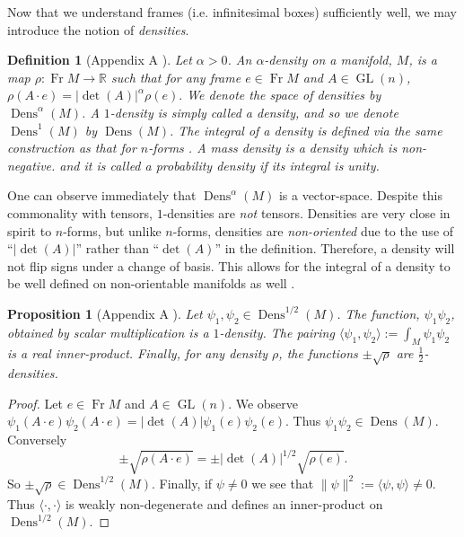\documentclass[letterpaper, 12 pt]{amsart}
\newcommand{\R}{\mathbb{R}}
\newtheorem{defn}[thm]{Definition}
\newtheorem{prop}[thm]{Proposition}
\DeclareMathOperator{\Fr}{Fr}
\DeclareMathOperator{\GL}{GL}
\DeclareMathOperator{\Dens}{Dens}
\begin{document}
  Now that we understand frames (i.e. infinitesimal boxes)
  sufficiently well, we may introduce the notion of \emph{densities}.

  \begin{defn}[Appendix A \cite{BatesWeinstein1997}]
    \label{eq:density}
    Let $\alpha > 0$.
    An $\alpha$-\emph{density} on a manifold, $M$, is a map
    $\rho:\Fr M \to \R$ such that
    for any frame $e \in \Fr M$ and $A \in \GL(n)$,
    $
      \rho( A \cdot e ) =  | \det(A) |^\alpha \rho(e).
    $
    We denote the space of densities by $\Dens^\alpha(M)$.
    A $1$-density is simply called a \emph{density}, and
    so we denote $\Dens^1(M)$ by $\Dens(M)$.
    The integral of a density is defined via the same construction as that
    for $n$-forms \cite[Ch. 14]{Lee2006}.
    A \emph{mass density} is a density which is non-negative.
    and it is called a \emph{probability density} if its integral is
    unity.
  \end{defn}

  One can observe immediately that $\Dens^\alpha(M)$ is a vector-space.
  Despite this commonality with tensors,
  $1$-densities are \emph{not} tensors.
  Densities are very close in spirit to $n$-forms,
  but unlike $n$-forms, densities are \emph{non-oriented}
  due to the use of ``$|\det(A)|$'' rather than ``$\det(A)$'' 
  in the definition.
  Therefore, a density will not flip signs under a change of basis.
  This allows for the integral of a density to be well defined
  on non-orientable manifolds as well \cite[Ch. 14]{Lee2006}.

  \begin{prop}[Appendix A \cite{BatesWeinstein1997}]
    Let $\psi_1,\psi_2 \in \Dens^{1/2}(M)$.
    The function, $\psi_1 \psi_2$, obtained by
    scalar multiplication is a $1$-density.
    The pairing
    $
    \langle \psi_1, \psi_2 \rangle := \int_M \psi_1 \psi_2 
    $
    is a real inner-product.
    Finally, for any density $\rho$, the functions $\pm\sqrt{\rho}$ are
    $\frac{1}{2}$-densities.
  \end{prop}
  \begin{proof}
    Let $e \in \Fr M$ and $A \in \GL(n)$.
    We observe $\psi_1(A \cdot e) \psi_2(A \cdot e) = |\det(A) | \psi_1(e) \psi_2(e)$.  Thus $\psi_1 \psi_2 \in \Dens(M)$.
    Conversely $$\pm \sqrt{\rho( A \cdot e)} = \pm | \det(A) |^{1/2} \sqrt{ \rho(e)}.$$ So $\pm \sqrt{\rho} \in \Dens^{1/2}(M)$.
    Finally, if $\psi \neq 0$ we see that $\| \psi \|^2 := \langle \psi , \psi \rangle \neq 0$.
    Thus $\langle \cdot , \cdot \rangle$ is weakly non-degenerate
    and defines an inner-product on $\Dens^{1/2}(M)$.
  \end{proof}
\end{document}
